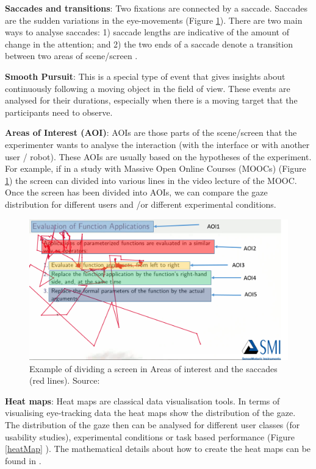 \documentclass{sig-alternate}
\begin{document}
 \textbf {Saccades and transitions}: Two fixations are connected by a saccade. Saccades are the sudden variations in the eye-movements (Figure \ref{aoi}). There are two main ways to analyse saccades: 1) saccade lengths are indicative of the amount of change in the attention; and 2) the two ends of a saccade denote a transition between two areas of scene/screen .

 \textbf {Smooth Pursuit}: This is a special type of event that gives insights about continuously following a moving object in the field of view. These events are analysed for their durations, especially when there is a moving target that the participants need to observe.

 \textbf {Areas of Interest (AOI)}:  AOIs are those parts of the scene/screen that the experimenter wants to analyse the interaction (with the interface or with another user / robot). These AOIs are usually based on the hypotheses of the experiment. For example, if in a study with Massive Open Online Courses (MOOCs) (Figure \ref{aoi}) the screen can divided into various lines in the video lecture of the MOOC. Once the screen has been divided into AOIs, we can compare the gaze distribution for different users and /or different experimental conditions.

\begin{figure}
    \centering
    \includegraphics[width=\linewidth]{scanpathVars}
    \caption{Example of dividing a screen in Areas of interest and the saccades (red lines). Source: \cite{sharma2014how}}
    \label{aoi}
\end{figure}


 \textbf {Heat maps}: Heat maps are classical data visualisation tools. In terms of visualising eye-tracking data the heat maps show the distribution of the gaze. The distribution of the gaze then can be analysed for different user classes (for usability studies), experimental conditions or task based performance (Figure \ref{heatMap} ). The mathematical details about how to create the heat maps can be found in \cite{duchowski2007eye}. 
\end{document}
